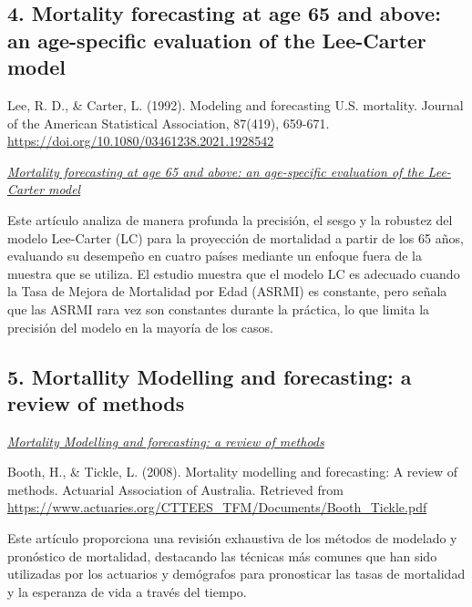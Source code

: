 \documentclass[
]{article}
\begin{document}
\hypertarget{mortality-forecasting-at-age-65-and-above-an-age-specific-evaluation-of-the-lee-carter-model}{%
\subsection{4. Mortality forecasting at age 65 and above: an
age-specific evaluation of the Lee-Carter
model}\label{mortality-forecasting-at-age-65-and-above-an-age-specific-evaluation-of-the-lee-carter-model}}

Lee, R. D., \& Carter, L. (1992). Modeling and forecasting U.S.
mortality. Journal of the American Statistical Association, 87(419),
659-671. \url{https://doi.org/10.1080/03461238.2021.1928542}

\href{https://www.tandfonline.com/doi/full/10.1080/03461238.2021.1928542\#d1e148}{\emph{Mortality
forecasting at age 65 and above: an age-specific evaluation of the
Lee-Carter model}}

Este artículo analiza de manera profunda la precisión, el sesgo y la
robustez del modelo Lee-Carter (LC) para la proyección de mortalidad a
partir de los 65 años, evaluando su desempeño en cuatro países mediante
un enfoque fuera de la muestra que se utiliza. El estudio muestra que el
modelo LC es adecuado cuando la Tasa de Mejora de Mortalidad por Edad
(ASRMI) es constante, pero señala que las ASRMI rara vez son constantes
durante la práctica, lo que limita la precisión del modelo en la mayoría
de los casos.

\hypertarget{mortallity-modelling-and-forecasting-a-review-of-methods}{%
\subsection{5. Mortallity Modelling and forecasting: a review of
methods}\label{mortallity-modelling-and-forecasting-a-review-of-methods}}

\href{https://www.actuaries.org/CTTEES_TFM/Documents/Booth_Tickle.pdf}{\emph{Mortality
Modelling and forecasting: a review of methods}}

Booth, H., \& Tickle, L. (2008). Mortality modelling and forecasting: A
review of methods. Actuarial Association of Australia. Retrieved from
\url{https://www.actuaries.org/CTTEES_TFM/Documents/Booth_Tickle.pdf}

Este artículo proporciona una revisión exhaustiva de los métodos de
modelado y pronóstico de mortalidad, destacando las técnicas más comunes
que han sido utilizadas por los actuarios y demógrafos para pronosticar
las tasas de mortalidad y la esperanza de vida a través del tiempo.
\end{document}
